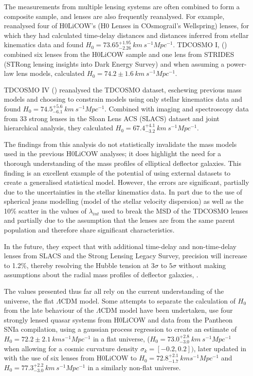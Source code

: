 \documentclass[12pt]{report}
\begin{document}
The measurements from multiple lensing systems are often combined to form a composite sample, and lenses are also frequently reanalysed. For example, \textcite{Yang2020} reanalysed four of H0LiCOW's (H0 Lenses in COsmograil's Wellspring) lenses, for which they had calculated time-delay distances and distances inferred from stellar kinematics data and found $H_{0} = 73.65^{+1.95}_{-2.26} \ km \ s^{-1} Mpc^{-1}$. TDCOSMO I, (\textcite{Millon2020}) combined six lenses from the H0LiCOW sample and one lens from STRIDES (STRong lensing insights into Dark Energy Survey) and when assuming a power-law lens models, calculated $H_{0} = 74.2 \pm 1.6 \ km \ s^{-1} Mpc^{-1}$. 

TDCOSMO IV (\textcite{Birrer2020}) reanalysed the TDCOSMO dataset, eschewing previous mass models and choosing to constrain models using only stellar kinematics data and found $H_{0} = 74.5^{+5.6}_{-6.1} \ km \ s^{-1} Mpc^{-1}$. Combined with imaging and spectroscopy data from 33 strong lenses in the Sloan Lens ACS (SLACS) dataset and joint hierarchical analysis, they calculated $H_{0} = 67.4^{+4.1}_{-3.2} \ km \ s^{-1} Mpc^{-1}$. 

The findings from this analysis do not statistically invalidate the mass models used in the previous H0LiCOW analyses; it does highlight the need for a thorough understanding of the mass profiles of elliptical deflector galaxies. This finding is an excellent example of the potential of using external datasets to create a generalised statistical model. However, the errors are significant, partially due to the uncertainties in the stellar kinematics data. In part due to the use of spherical jeans modelling (model of the stellar velocity dispersion) as well as the 10\% scatter in the values of $\lambda_{int}$ used to break the MSD of the TDCOSMO lenses and partially due to the assumption that the lenses are from the same parent population and therefore share significant characteristics. 

In the future, they expect that with additional time-delay and non-time-delay lenses from SLACS and the Strong Lensing Legacy Survey, precision will increase to 1.2\%, thereby resolving the Hubble tension at $3\sigma$ to $5\sigma$ without making assumptions about the radial mass profiles of deflector galaxies, \textcite{Birrer2021}. 

The values presented thus far all rely on the current understanding of the universe, the flat $\Lambda$CDM model. Some attempts to separate the calculation of $H_{0}$ from the late behaviour of the $\Lambda$CDM model have been undertaken, \textcite{Liao2019} use four strongly lensed quasar systems from H0LiCOW and data from the Pantheon SNIa compilation, using a gaussian process regression to create an estimate of $H_{0} = 72.2 \pm 2.1 \ km s^{-1} Mpc^{-1}$ in a flat universe, ($H_{0} = 73.0^{+2.8}_{-3.0} \ km \ s^{-1} Mpc^{-1}$ when allowing for a cosmic curvature density $\sigma_{k} = [-0.2, 0.2])$, later updated in \textcite{Liao2020} with the use of six lenses from H0LiCOW to $H_{0} = 72.8^{+2.1}_{-1.7} \ km s^{-1} Mpc^{-1}$ and $H_{0} = 77.3^{+2.2}_{-3.0} \ km \ s^{-1} Mpc^{-1}$ in a similarly non-flat universe.
\end{document}
